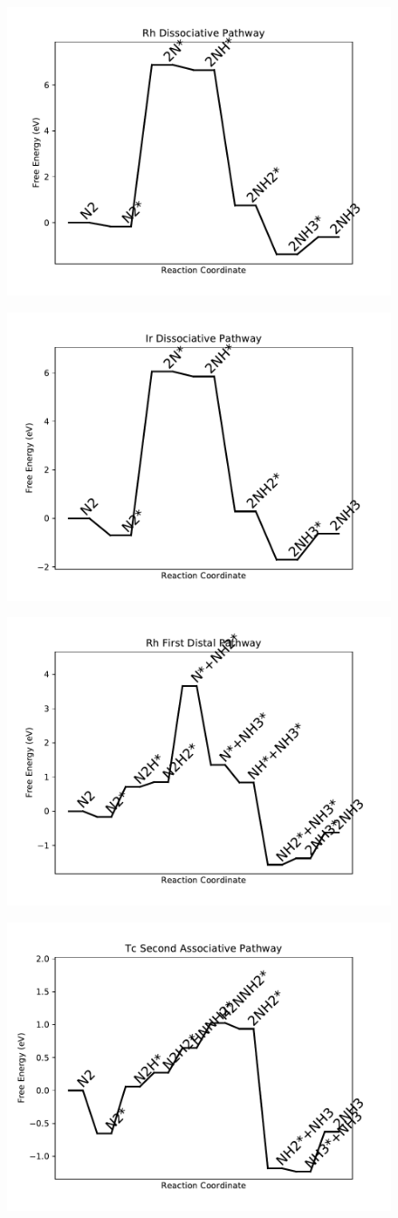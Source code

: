 \documentclass[journal=jacsat,manuscript=article]{achemso}
\begin{document}
\begin{figure}
\includegraphics[width=0.5\linewidth]{data/plots/Rh_dissociative.pdf}
\label{fig:Rh_dissociative}
\end{figure}

\begin{figure}
\includegraphics[width=0.5\linewidth]{data/plots/Ir_dissociative.pdf}
\label{fig:Ir_dissociative}
\end{figure}

\begin{figure}
\includegraphics[width=0.5\linewidth]{data/plots/Rh_distal_1.pdf}
\label{fig:Rh_distal_1}
\end{figure}

\begin{figure}
\includegraphics[width=0.5\linewidth]{data/plots/Tc_associative_2.pdf}
\label{fig:Tc_associative_2}
\end{figure}
\end{document}
